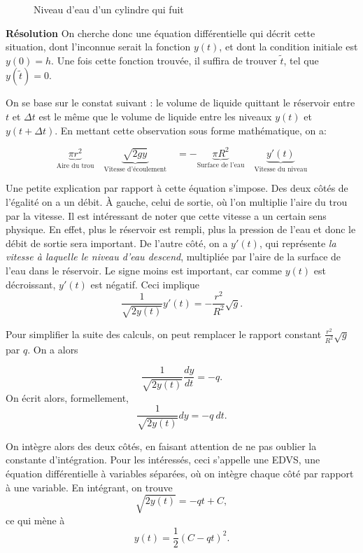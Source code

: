 \documentclass{article}
\begin{document}
\begin{figure}[H]
    \centering
    
    
    \caption{Niveau d'eau d'un cylindre qui fuit}
    \label{fig:cyl}
\end{figure}

\textbf{Résolution} On cherche donc une équation différentielle qui décrit cette situation, dont l'inconnue serait la fonction $y(t)$, et dont la condition initiale est $y(0) = h$. Une fois cette fonction trouvée, il suffira de trouver $\tilde{t}$, tel que $y(\tilde{t}) = 0$.

On se base sur le constat suivant : le volume de liquide quittant le réservoir entre $t$ et $\Delta t$ est le même que le volume de liquide entre les niveaux $y(t)$ et $y(t + \Delta t)$.
En mettant cette observation sous forme mathématique, on a:

\[ \underbrace{\pi r^2}_{\text{Aire du trou}} \quad \underbrace{\sqrt{2gy}}_{\text{Vitesse d'écoulement}} \quad = -\underbrace{\pi R^2}_{\text{Surface de l'eau}} \quad \underbrace{y'(t)}_{\text{Vitesse du niveau}} \]

Une petite explication par rapport à cette équation s'impose. Des deux côtés de l'égalité on a un débit. À gauche, celui de sortie, où l'on multiplie l'aire du trou par la vitesse. Il est intéressant de noter que cette vitesse a un certain sens physique. En effet, plus le réservoir est rempli, plus la pression de l'eau et donc le débit de sortie sera important. De l'autre côté, on a $y'(t)$, qui représente \textit{la vitesse à laquelle le niveau d'eau descend}, multipliée par l'aire de la surface de l'eau dans le réservoir. Le signe moins est important, car comme $y(t)$ est décroissant, $y'(t)$ est négatif. Ceci implique
\[ \frac{1}{ \sqrt{2y(t)}} y'(t) = - \frac{r^2}{R^2} \sqrt{g}. \]

\noindent Pour simplifier la suite des calculs, on peut remplacer le rapport constant $\frac{r^2}{R^2} \sqrt{g}$ par $q$. On a alors

\[ \frac{1}{ \sqrt{2y(t)}} \frac{dy}{dt} = -q.\]
On écrit alors, formellement,
\[ \frac{1}{ \sqrt{2y(t)}} dy = -q \: dt.\]

On intègre alors des deux côtés, en faisant attention de ne pas oublier la constante d'intégration. Pour les intéressés, ceci s'appelle une EDVS, une équation différentielle à variables séparées, où on intègre chaque côté par rapport à une variable. En intégrant, on trouve
\[ \sqrt{2y(t)} = -q t+ C, \]
ce qui mène à
\[ y(t) = \frac{1}{2}(C - q t)^2.\]
\end{document}
